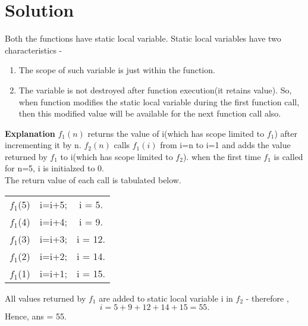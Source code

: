 \documentclass[journal,12pt,twocolumn]{IEEEtran}
\begin{document}
\section{Solution}
Both the functions have static local variable. Static local variables have two characteristics  - 
\begin{enumerate}
    \item The scope of such variable is just within the function.
    \item The variable is not destroyed after function execution(it retains value). So, when function modifies the static local variable during the first function call, then this modified value will be available for the next function call also.
\end{enumerate}
\textbf{Explanation}
$f_1(n)$ returns the value of i(which has scope limited to $f_1$) after incrementing it by n.
\newline
$f_2(n)$ calls $f_1(i)$ from i=n to i=1 and adds the value returned by $f_1$ to i(which has scope limited to $f_2$).
\newline
when the first time $f_1$ is called for n=5, i is initialzed to 0. \\
The return value of each call is tabulated below.
\begin{center}
\begin{tabular}{ |c|c|c| } 
 \hline
$f_1$(5)  & i=i+5; & i = 5. \\
$f_1$(4)  & i=i+4; & i = 9. \\
$f_1$(3)  & i=i+3; & i = 12. \\
$f_1$(2)  & i=i+2; & i = 14. \\
$f_1$(1)  & i=i+1; & i = 15. \\
 \hline
\end{tabular}
\end{center}
All values returned by $f_1$ are added to static local variable i in $f_2$ - 
\newline
therefore ,
\newline
\begin{equation*}
i = 5+9+12+14+15 = 55.
\end{equation*}
Hence, ans = 55.
\end{document}
